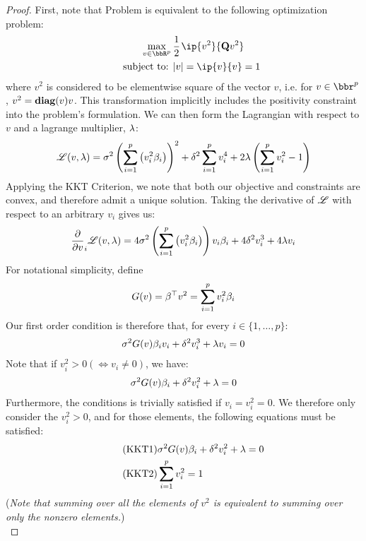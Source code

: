 \documentclass[12pt,leqno,letterpaper]{article}
\begin{document}
\begin{proof}
First, note that Problem  is equivalent to the following optimization problem:
\begin{align*}
\begin{aligned}
 \hspace{0.5in}\max_{v \in \bbR^p} \ptt
  &\frac{1}{2} \pt \ip{v^2}{\bQ v^2} \\
 \text{subject to: }
	&|v| = \ip{v}{v}= 1
\label{con2}
\end{aligned}
\end{align*}
where $v^2$ is considered to be elementwise square of the vector $v$, i.e. for $v \in \bbr^p$, $v^2 = \textbf{diag}(v)v$.  This transformation implicitly includes the positivity constraint into the problem's formulation.  We can then form the Lagrangian with respect to $v$ and a lagrange multiplier, $\lambda$:
\begin{align}
\lscr(v, \gl) = \gs^2 \paren{\sum_{i=1}^p \paren{v_i^2 \gb_i}}^2 + \gd^2 \sum_{i=1}^p v_i^4 + 2\gl\paren{\sum_{i=1}^p v_i^2 -1 }
\end{align}
Applying the KKT Criterion, we note that both our objective and constraints are convex, and therefore admit a unique solution.  Taking the derivative of $\mathscr{L}$ with respect to an arbitrary $v_i$ gives us:
\begin{align}
\diff  v_i \lscr(v,\gl) = 4\gs^2 \paren{\sum_{i=1}^p \paren{v_i^2\gb_i}}v_i\gb_i + 4 \gd^2 v_i^3 + 4 \gl v_i
\end{align}
For notational simplicity, define $$G(v) =\gb^\T v^2= \sum_{i=1}^p v_i^2 \gb_i$$
Our first order condition is therefore that, for every $i \in \{ 1, \ldots,p\}$:
\begin{align}\label{foc}
\sigma^2 G(v) \beta_iv_i+  \delta^2  v_i^3 +  \lambda v_i=0
\end{align}
Note that if $v_i^2>0 (\iff v_i \neq 0)$, we have:
\begin{align}
\sigma^2 G(v) \beta_i + \delta^2 v_i^2 + \lambda = 0
\end{align}
Furthermore, the conditions  is trivially satisfied if $v_i=v_i^2=0$.  We therefore only consider the $v_i^2>0$, and for those elements, the following equations must be satisfied:
\begin{align}
\label{kkt1}\tag{KKT1} &\gs^2 G(v) \gb_i +\gd^2 v_i^2 + \gl=0\\
\label{kkt2} \tag{KKT2}&\sum_{i=1}^p v_i^2 =1
\end{align}
(\textit{Note that summing over all the elements of $v^2$ is equivalent to summing over only the nonzero elements.})\\

\end{proof}
\end{document}
